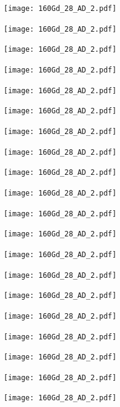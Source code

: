 \begin{center}
\texttt{[image: 160Gd\_28\_AD\_2.pdf]}
\end{center}
\begin{center}
\texttt{[image: 160Gd\_28\_AD\_2.pdf]}
\end{center}
\begin{center}
\texttt{[image: 160Gd\_28\_AD\_2.pdf]}
\end{center}
\begin{center}
\texttt{[image: 160Gd\_28\_AD\_2.pdf]}
\end{center}
\begin{center}
\texttt{[image: 160Gd\_28\_AD\_2.pdf]}
\end{center}
\begin{center}
\texttt{[image: 160Gd\_28\_AD\_2.pdf]}
\end{center}
\begin{center}
\texttt{[image: 160Gd\_28\_AD\_2.pdf]}
\end{center}
\begin{center}
\texttt{[image: 160Gd\_28\_AD\_2.pdf]}
\end{center}
\begin{center}
\texttt{[image: 160Gd\_28\_AD\_2.pdf]}
\end{center}
\begin{center}
\texttt{[image: 160Gd\_28\_AD\_2.pdf]}
\end{center}
\begin{center}
\texttt{[image: 160Gd\_28\_AD\_2.pdf]}
\end{center}
\begin{center}
\texttt{[image: 160Gd\_28\_AD\_2.pdf]}
\end{center}
\begin{center}
\texttt{[image: 160Gd\_28\_AD\_2.pdf]}
\end{center}
\begin{center}
\texttt{[image: 160Gd\_28\_AD\_2.pdf]}
\end{center}
\begin{center}
\texttt{[image: 160Gd\_28\_AD\_2.pdf]}
\end{center}
\begin{center}
\texttt{[image: 160Gd\_28\_AD\_2.pdf]}
\end{center}
\begin{center}
\texttt{[image: 160Gd\_28\_AD\_2.pdf]}
\end{center}
\begin{center}
\texttt{[image: 160Gd\_28\_AD\_2.pdf]}
\end{center}
\begin{center}
\texttt{[image: 160Gd\_28\_AD\_2.pdf]}
\end{center}
\begin{center}
\texttt{[image: 160Gd\_28\_AD\_2.pdf]}
\end{center}
